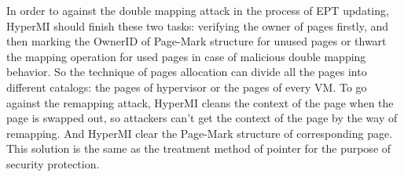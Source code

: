 \documentclass[conference]{IEEEtran}
\begin{document}
%
%
%
In order to against the double mapping attack in the process of EPT updating, HyperMI should finish these two tasks: verifying the owner of pages firstly, and then marking the OwnerID of Page-Mark structure for unused pages or thwart the mapping operation for used pages in case of malicious double mapping behavior. So the technique of pages allocation can divide all the pages into different catalogs: the pages of hypervisor or the pages of every VM.
To go against the remapping attack, HyperMI cleans the context of the page when the page is swapped out, so attackers can't get the context of the page by the way of remapping. And HyperMI clear the Page-Mark structure of corresponding page. This solution is the same as the treatment method of pointer for the purpose of security protection. 

\end{document}
